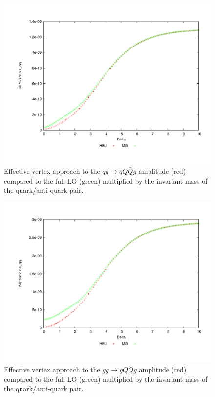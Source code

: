 \begin{figure}[H]
\centering
\includegraphics[scale=0.47]{Images/qg_qqqxg_sqq_simplecf.pdf}
\caption{Effective vertex approach to the $qg \to qQ\bar{Q}g$ amplitude (red) compared to the full LO (green) multiplied by the invariant mass of the quark/anti-quark pair.}
\label{fig:qg_qqqg}
\end{figure}

\begin{figure}[H]
\centering
\includegraphics[scale=0.47]{Images/gg_gqqxg_sqq_simplecf.pdf}
\caption{Effective vertex approach to the $gg \to gQ\bar{Q}g$ amplitude (red) compared to the full LO (green) multiplied by the invariant mass of the quark/anti-quark pair.}
\label{fig:gg_gqqg}
\end{figure}

